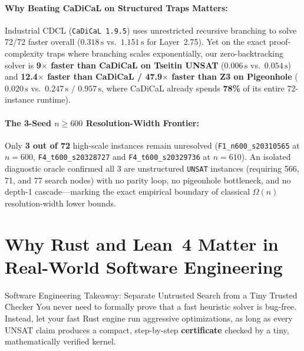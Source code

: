 \documentclass[11pt]{article}
\begin{document}
\paragraph{Why Beating CaDiCaL on Structured Traps Matters:} Industrial CDCL (\texttt{CaDiCaL~1.9.5}) uses unrestricted recursive branching to solve 72/72 faster overall ($0.318\,\text{s}$ vs.\ $1.151\,\text{s}$ for Layer~2.75). Yet on the exact proof-complexity traps where branching scales exponentially, our zero-backtracking solver is \textbf{9$\times$ faster than CaDiCaL on Tseitin UNSAT} ($0.006\,\text{s}$ vs.\ $0.054\,\text{s}$) and \textbf{12.4$\times$ faster than CaDiCaL / 47.9$\times$ faster than Z3 on Pigeonhole} ($0.020\,\text{s}$ vs.\ $0.247\,\text{s}$ / $0.957\,\text{s}$, where CaDiCaL already spends \textbf{78\%} of its entire 72-instance runtime).

\paragraph{The 3-Seed $n \ge 600$ Resolution-Width Frontier:} Only \textbf{3 out of 72} high-scale instances remain unresolved (\texttt{F1\_n600\_s20310565} at $n=600$, \texttt{F4\_t600\_s20328727} and \texttt{F4\_t600\_s20329736} at $n=610$). An isolated diagnostic oracle confirmed all 3 are unstructured \texttt{UNSAT} instances (requiring 566, 71, and 77 search nodes) with no parity loop, no pigeonhole bottleneck, and no depth-1 cascade---marking the exact empirical boundary of classical $\Omega(n)$ resolution-width lower bounds.

\section{Why Rust and Lean~4 Matter in Real-World Software Engineering}

\begin{takeaway}{Software Engineering Takeaway: Separate Untrusted Search from a Tiny Trusted Checker}
You never need to formally prove that a fast heuristic solver is bug-free. Instead, let your fast Rust engine run aggressive optimizations, as long as every UNSAT claim produces a compact, step-by-step \textbf{certificate} checked by a tiny, mathematically verified kernel.
\end{takeaway}
\end{document}
